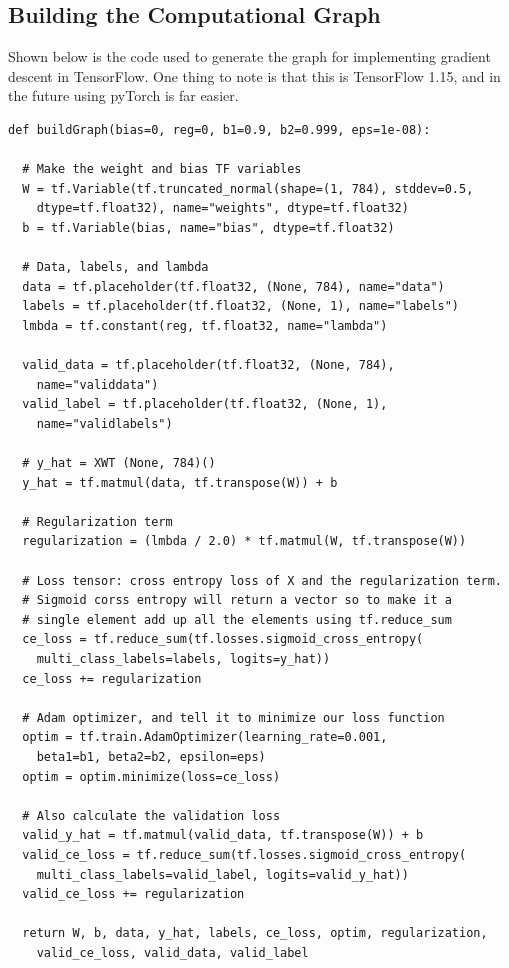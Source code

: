 \documentclass[12pt]{article}
\begin{document}
\subsection{Building the Computational Graph}
Shown below is the code used to generate the graph for implementing gradient descent in TensorFlow.
One thing to note is that this is TensorFlow 1.15, and in the future using pyTorch is far easier.

\begin{verbatim}
def buildGraph(bias=0, reg=0, b1=0.9, b2=0.999, eps=1e-08):

  # Make the weight and bias TF variables
  W = tf.Variable(tf.truncated_normal(shape=(1, 784), stddev=0.5, 
    dtype=tf.float32), name="weights", dtype=tf.float32)
  b = tf.Variable(bias, name="bias", dtype=tf.float32)

  # Data, labels, and lambda 
  data = tf.placeholder(tf.float32, (None, 784), name="data")
  labels = tf.placeholder(tf.float32, (None, 1), name="labels")
  lmbda = tf.constant(reg, tf.float32, name="lambda")

  valid_data = tf.placeholder(tf.float32, (None, 784), 
    name="validdata")
  valid_label = tf.placeholder(tf.float32, (None, 1), 
    name="validlabels")

  # y_hat = XWT (None, 784)()
  y_hat = tf.matmul(data, tf.transpose(W)) + b

  # Regularization term 
  regularization = (lmbda / 2.0) * tf.matmul(W, tf.transpose(W))

  # Loss tensor: cross entropy loss of X and the regularization term.
  # Sigmoid corss entropy will return a vector so to make it a 
  # single element add up all the elements using tf.reduce_sum
  ce_loss = tf.reduce_sum(tf.losses.sigmoid_cross_entropy(
    multi_class_labels=labels, logits=y_hat))
  ce_loss += regularization

  # Adam optimizer, and tell it to minimize our loss function
  optim = tf.train.AdamOptimizer(learning_rate=0.001, 
    beta1=b1, beta2=b2, epsilon=eps)
  optim = optim.minimize(loss=ce_loss)

  # Also calculate the validation loss 
  valid_y_hat = tf.matmul(valid_data, tf.transpose(W)) + b
  valid_ce_loss = tf.reduce_sum(tf.losses.sigmoid_cross_entropy(
    multi_class_labels=valid_label, logits=valid_y_hat))
  valid_ce_loss += regularization

  return W, b, data, y_hat, labels, ce_loss, optim, regularization, 
    valid_ce_loss, valid_data, valid_label
\end{verbatim}
\end{document}
